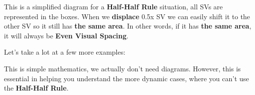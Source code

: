

This is a simplified diagram for a \textbf{Half-Half Rule} situation, all SVs are represented in the boxes. When we \textbf{displace} 0.5x SV we can easily shift it to the other SV so it still has \textbf{the same area}. In other words, if it has \textbf{the same area}, it will always be \textbf{Even Visual Spacing}.

Let's take a lot at a few more examples:



This is simple mathematics, we actually don't need diagrams. However, this is essential in helping you understand the more dynamic cases, where you can't use the \textbf{Half-Half Rule}.